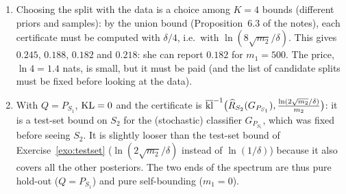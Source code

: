 \documentclass[11pt]{article}
\newcounter{exo}
\begin{document}
\begin{solution}
\begin{enumerate}
      data-free prior is large compared with $\ln(2\sqrt m/\delta)$, as for large models.
\item Choosing the split with the data is a choice among $K=4$ bounds (different priors and samples): by the union bound
      (Proposition~6.3 of the notes), each certificate must be computed with $\delta/4$, i.e.\ with $\ln(8\sqrt{m_2}/\delta)$.
      This gives $0.245$, $0.188$, $0.182$ and $0.218$: she can report $0.182$ for $m_1=500$. The price, $\ln4=1.4$ nats, is
      small, but it must be paid (and the list of candidate splits must be fixed before looking at the data).
\item With $Q=P_{S_1}$, $\operatorname{KL}=0$ and the certificate is $\overline{\operatorname{kl}}^{-1}\big(\widehat R_{S_2}(G_{P_{S_1}}),\frac{\ln(2\sqrt{m_2}/\delta)}{m_2}\big)$: it is a
      test-set bound on $S_2$ for the (stochastic) classifier $G_{P_{S_1}}$, which was fixed before seeing $S_2$. It is slightly
      looser than the test-set bound of Exercise~\ref{exo:testset} ($\ln(2\sqrt{m_2}/\delta)$ instead of $\ln(1/\delta)$) because it
      also covers all the other posteriors. The two ends of the spectrum are thus pure hold-out ($Q=P_{S_1}$) and pure
      self-bounding ($m_1=0$).
\end{enumerate}
\end{solution}
\end{document}
